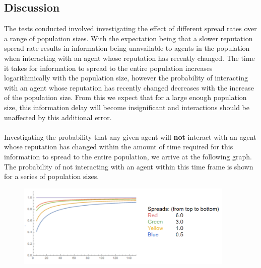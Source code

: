 \documentclass[10pt,a4paper]{article}
\begin{document}
\subsection{Discussion}
The tests conducted involved investigating the effect of different spread rates over a range of population sizes.
With the expectation being that a slower reputation spread rate results in information being unavailable to agents in the population when interacting with an agent whose reputation has recently changed.
The time it takes for information to spread to the entire population increases logarithmically with the population size, however the probability of interacting with an agent whose reputation has recently changed decreases with the increase of the population size.
From this we expect that for a large enough population size, this information delay will become insignificant and interactions should be unaffected by this additional error.
\\\\
Investigating the probability that any given agent will \textbf{not} interact with an agent whose reputation has changed within the amount of time required for this information to spread to the entire population, we arrive at the following graph.
The probability of not interacting with an agent within this time frame is shown for a series of population sizes.
\begin{figure}[h!]
\begin{center}
  \includegraphics[width=28em]{Images/probability_of_interaction.png}
\end{center}
  \label{fig:ProbabilityComms}
\end{figure}
\end{document}
